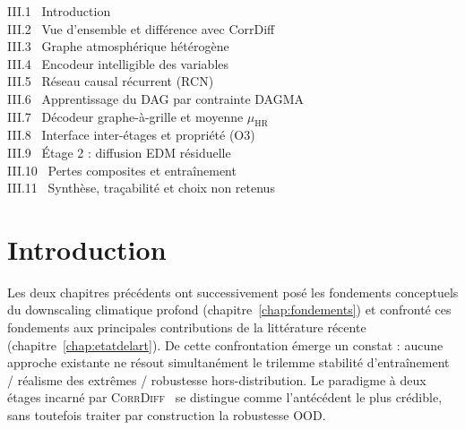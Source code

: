 \documentclass[14pt,a4paper,openany]{extreport}
\theoremstyle{definition}
\newcommand{\CorrDiff}{\textsc{CorrDiff}}
\newcommand{\HR}{\ensuremath{\text{HR}}}
\newcommand{\muHR}{\ensuremath{\mu_{\HR}}}
\begin{document}
\begin{sommairebox}
\small
\noindent III.1 \ Introduction \dotfill \pageref{sec:oracle-intro}\\
\noindent III.2 \ Vue d'ensemble et différence avec CorrDiff \dotfill \pageref{sec:oracle-overview}\\
\noindent III.3 \ Graphe atmosphérique hétérogène \dotfill \pageref{sec:oracle-graphe}\\
\noindent III.4 \ Encodeur intelligible des variables \dotfill \pageref{sec:oracle-encoder}\\
\noindent III.5 \ Réseau causal récurrent (RCN) \dotfill \pageref{sec:oracle-rcn}\\
\noindent III.6 \ Apprentissage du DAG par contrainte DAGMA \dotfill \pageref{sec:oracle-dagma}\\
\noindent III.7 \ Décodeur graphe-à-grille et moyenne $\muHR$ \dotfill \pageref{sec:oracle-decoder}\\
\noindent III.8 \ Interface inter-étages et propriété (O3) \dotfill \pageref{sec:oracle-o3}\\
\noindent III.9 \ Étage 2 : diffusion EDM résiduelle \dotfill \pageref{sec:oracle-edm}\\
\noindent III.10 \ Pertes composites et entraînement \dotfill \pageref{sec:oracle-pertes}\\
\noindent III.11 \ Synthèse, traçabilité et choix non retenus \dotfill \pageref{sec:oracle-synthese}
\end{sommairebox}

\vspace{1em}

\section{Introduction}
\label{sec:oracle-intro}

Les deux chapitres précédents ont successivement posé les fondements conceptuels du downscaling climatique profond (chapitre~\ref{chap:fondements}) et confronté ces fondements aux principales contributions de la littérature récente (chapitre~\ref{chap:etatdelart}). De cette confrontation émerge un constat : aucune approche existante ne résout simultanément le trilemme stabilité d'entraînement / réalisme des extrêmes / robustesse hors-distribution. Le paradigme à deux étages incarné par \CorrDiff{}~\cite{mardani_corrdiff_2023} se distingue comme l'antécédent le plus crédible, sans toutefois traiter par construction la robustesse OOD.
\end{document}
